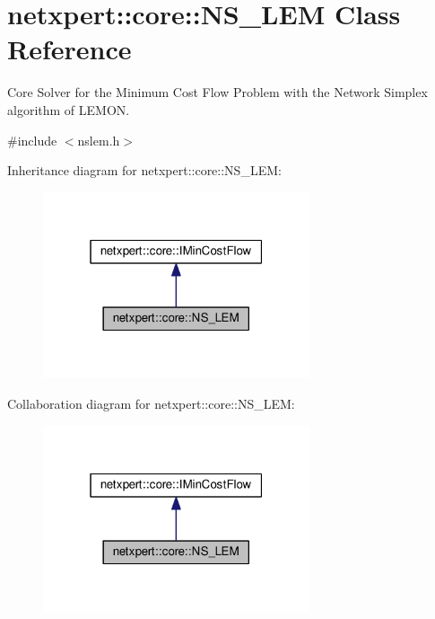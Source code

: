 \hypertarget{classnetxpert_1_1core_1_1NS__LEM}{}\section{netxpert\+:\+:core\+:\+:N\+S\+\_\+\+L\+EM Class Reference}
\label{classnetxpert_1_1core_1_1NS__LEM}


Core Solver for the Minimum Cost Flow Problem with the Network Simplex algorithm of L\+E\+M\+ON.  




{\ttfamily \#include $<$nslem.\+h$>$}



Inheritance diagram for netxpert\+:\+:core\+:\+:N\+S\+\_\+\+L\+EM\+:\nopagebreak
\begin{figure}[H]
\begin{center}
\leavevmode
\includegraphics[width=223pt]{classnetxpert_1_1core_1_1NS__LEM__inherit__graph}
\end{center}
\end{figure}


Collaboration diagram for netxpert\+:\+:core\+:\+:N\+S\+\_\+\+L\+EM\+:\nopagebreak
\begin{figure}[H]
\begin{center}
\leavevmode
\includegraphics[width=223pt]{classnetxpert_1_1core_1_1NS__LEM__coll__graph}
\end{center}
\end{figure}
